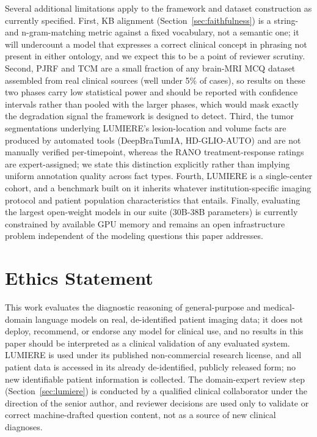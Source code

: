 \documentclass[11pt]{article}
\begin{document}
Several additional limitations apply to the framework and dataset construction as currently specified. First, KB alignment (Section~\ref{sec:faithfulness}) is a string- and n-gram-matching metric against a fixed vocabulary, not a semantic one; it will undercount a model that expresses a correct clinical concept in phrasing not present in either ontology, and we expect this to be a point of reviewer scrutiny. Second, PJRF and TCM are a small fraction of any brain-MRI MCQ dataset assembled from real clinical sources (well under 5\% of cases), so results on these two phases carry low statistical power and should be reported with confidence intervals rather than pooled with the larger phases, which would mask exactly the degradation signal the framework is designed to detect. Third, the tumor segmentations underlying LUMIERE's lesion-location and volume facts are produced by automated tools (DeepBraTumIA, HD-GLIO-AUTO) and are not manually verified per-timepoint, whereas the RANO treatment-response ratings are expert-assigned; we state this distinction explicitly rather than implying uniform annotation quality across fact types. Fourth, LUMIERE is a single-center cohort, and a benchmark built on it inherits whatever institution-specific imaging protocol and patient population characteristics that entails. Finally, evaluating the largest open-weight models in our suite (30B-38B parameters) is currently constrained by available GPU memory and remains an open infrastructure problem independent of the modeling questions this paper addresses.

\section*{Ethics Statement}

This work evaluates the diagnostic reasoning of general-purpose and medical-domain language models on real, de-identified patient imaging data; it does not deploy, recommend, or endorse any model for clinical use, and no results in this paper should be interpreted as a clinical validation of any evaluated system. LUMIERE is used under its published non-commercial research license, and all patient data is accessed in its already de-identified, publicly released form; no new identifiable patient information is collected. The domain-expert review step (Section~\ref{sec:lumiere}) is conducted by a qualified clinical collaborator under the direction of the senior author, and reviewer decisions are used only to validate or correct machine-drafted question content, not as a source of new clinical diagnoses.

%


\end{document}
